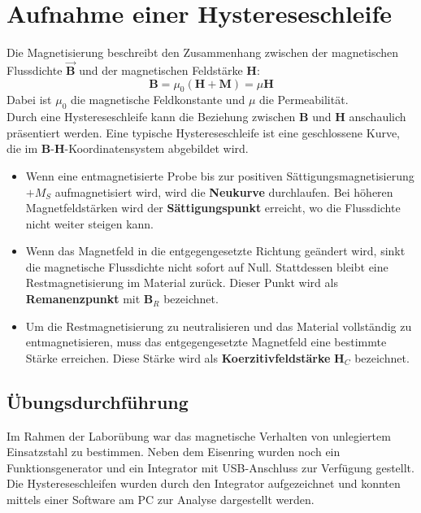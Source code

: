 \documentclass[a4paper,twoside,12pt,DIV=13,BCOR=5mm,numbers=noenddot,cleardoublepage=empty]{scrbook}
\begin{document}
\setcounter{chapter}{0}

\chapter{Aufnahme einer Hystereseschleife}

    Die Magnetisierung beschreibt den Zusammenhang zwischen der magnetischen Flussdichte $\Vec{\textbf{B}}$ und der magnetischen Feldstärke $\textbf{H}$:
    \begin{equation}
        \textbf{B} = \mu_0 (\textbf{H} + \textbf{M}) = \mu\textbf{H}
    \end{equation} 
    Dabei ist $\mu_0$ die magnetische Feldkonstante und $\mu$ die Permeabilität. \\
    Durch eine Hystereseschleife kann die Beziehung zwischen $\textbf{B}$ und $\textbf{H}$ anschaulich präsentiert werden. Eine typische Hystereseschleife ist eine geschlossene Kurve, die im \textbf{B}-\textbf{H}-Koordinatensystem abgebildet wird. \\
    
    \begin{itemize}
        \item Wenn eine entmagnetisierte Probe bis zur positiven Sättigungsmagnetisierung $+M_S$ aufmagnetisiert wird, wird die \textbf{Neukurve} durchlaufen. Bei höheren Magnetfeldstärken wird der \textbf{Sättigungspunkt} erreicht, wo die Flussdichte nicht weiter steigen kann.
        \item Wenn das Magnetfeld in die entgegengesetzte Richtung geändert wird, sinkt die magnetische Flussdichte nicht sofort auf Null. Stattdessen bleibt eine Restmagnetisierung im Material zurück. Dieser Punkt wird als \textbf{Remanenzpunkt} mit \textbf{B$_R$} bezeichnet.
        \item Um die Restmagnetisierung zu neutralisieren und das Material vollständig zu entmagnetisieren, muss das entgegengesetzte Magnetfeld eine bestimmte Stärke erreichen. Diese Stärke wird als \textbf{Koerzitivfeldstärke} \textbf{H$_C$} bezeichnet. \\
    \end{itemize}
    
    \section{Übungsdurchführung}
    
    Im Rahmen der Laborübung war das magnetische Verhalten von unlegiertem Einsatzstahl zu bestimmen. Neben dem Eisenring wurden noch ein Funktionsgenerator und ein Integrator mit USB-Anschluss zur Verfügung gestellt. Die Hystereseschleifen wurden durch den Integrator aufgezeichnet und konnten mittels einer Software am PC zur Analyse dargestellt werden.
\end{document}
